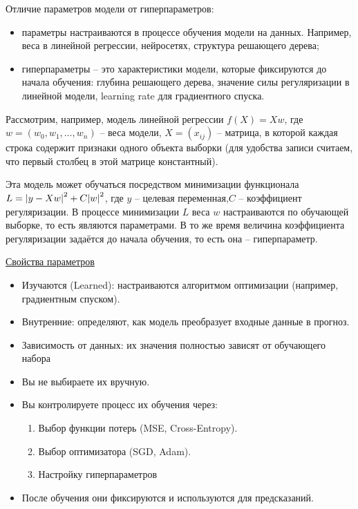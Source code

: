 \documentclass[a4paper, 14pt]{article}
\begin{document}
    Отличие параметров модели от гиперпараметров:
    
    \begin{itemize}
        \item параметры настраиваются в процессе обучения модели на данных.
        Например, веса в линейной регрессии, нейросетях, структура решающего дерева;
        \item гиперпараметры -- это характеристики модели, которые фиксируются до начала обучения: глубина решающего
        дерева, значение силы регуляризации в линейной модели, learning rate для градиентного спуска.
    \end{itemize}
    
    Рассмотрим, например, модель линейной регрессии $f(X) = X w$, где
    $w = (w_0,w_1,\dots,w_n)$ -- веса модели, $X=(x_{ij})$ -- матрица, в которой каждая строка содержит признаки
    одного объекта выборки (для удобства записи считаем, что первый столбец в этой матрице константный).
    
    Эта модель может обучаться посредством минимизации функционала $L = \abs{y - Xw}^2 + C\abs{w}^2$, где $y$ --
    целевая переменная,$C$ -- коэффициент регуляризации.
    В процессе минимизации $L$ веса $w$ настраиваются по обучающей выборке, то есть являются параметрами.
    В то же время величина коэффициента регуляризации задаётся до начала обучения, то есть она -- гиперпараметр.
    
    \underline{Свойства параметров}
    \begin{itemize}
        \item Изучаются (Learned): настраиваются алгоритмом оптимизации (например, градиентным спуском).
        \item Внутренние: определяют, как модель преобразует входные данные в прогноз.
        \item Зависимость от данных: их значения полностью зависят от обучающего набора
    \end{itemize}
    
    \begin{itemize}
        \item Вы не выбираете их вручную.
        \item Вы контролируете процесс их обучения через:
        \begin{enumerate}
            \item Выбор функции потерь (MSE, Cross-Entropy).
            \item Выбор оптимизатора (SGD, Adam).
            \item Настройку гиперпараметров
        \end{enumerate}
        \item После обучения они фиксируются и используются для предсказаний.
    \end{itemize}
    
\end{document}
